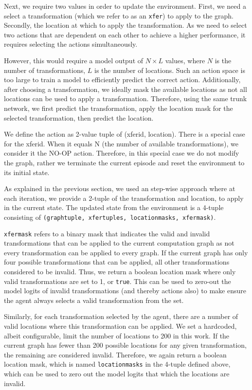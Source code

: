 Next, we require two values in order to update the environment. First, we need a select a transformation (which we refer to as an \texttt{xfer}) to apply to the graph. Secondly, the location at which to apply the transformation. As we need to select two actions that are dependent on each other to achieve a higher performance, it requires selecting the actions simultaneously.

However, this would require a model output of $N \times L$ values, where $N$ is the number of transformations, $L$ is the number of locations. Such an action space is too large to train a model to efficiently predict the correct action. Additionally, after choosing a transformation, we ideally mask the available locations as not all locations can be used to apply a transformation. Therefore, using the same trunk network, we first predict the transformation, apply the location mask for the selected transformation, then predict the location.

We define the action as 2-value tuple of (xfer\textunderscore id, location). There is a special case for the xfer\textunderscore id. When it equals N (the number of available transformations), we consider it the NO-OP action. Therefore, in this special case we do not modify the graph, rather we terminate the current episode and reset the environment to its initial state.

As explained in the previous section, we used an step-wise approach where at each iteration, we provide a 2-tuple of the transformation and location, to apply in the current state. The updated state from the environment is a 4-tuple consisting of \texttt{(graph\textunderscore tuple, xfer\textunderscore tuples, location\textunderscore masks, xfer\textunderscore mask)}.

\texttt{xfer\textunderscore mask} refers to a binary mask that indicates the valid and invalid transformations that can be applied to the current computation graph as not every transformation can be applied to every graph. If the current graph has only four possible transformations that can be applied, all other transformations considered to be invalid. Thus, we return a boolean location mask where only valid transformations are set to 1, or \texttt{true}. This can be used to zero-out the model logits of invalid transformations (and thereby actions also) to make ensure the agent always selects a valid transformation from the set.

Similarly, for each transformation selected by the agent, there are a number of valid locations where this transformation can be applied. We set a hardcoded, albeit configurable, limit the number of locations to 200 in this work. If the current graph has fewer than 200 possible locations for any given transformation, the remaining are considered invalid. Therefore, we again return a boolean location mask, which is named \texttt{location\textunderscore masks} in the 4-tuple defined above, which can be used to zero out the model logits that which the locations are invalid. 

